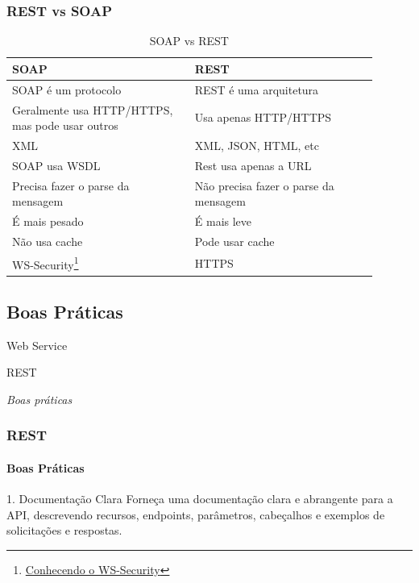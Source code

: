 \documentclass[
	10pt, %
	t, %
]{beamer}
\begin{document}
\begin{frame}
	\frametitle{REST vs SOAP}
	
	\begin{table}
		\renewcommand{\arraystretch}{1.25} %
		\begin{tabular}{|p{0.45\linewidth}|p{0.45\linewidth}|}
			\hline
			\textbf{SOAP} & \textbf{REST} \\ \hline
			SOAP é um protocolo & REST é uma arquitetura \\ \hline
			Geralmente usa HTTP/HTTPS, mas pode usar outros & Usa apenas HTTP/HTTPS \\ \hline
			XML & XML, JSON, HTML, etc \\ \hline
			SOAP usa WSDL & Rest usa apenas a URL \\ \hline
			Precisa fazer o parse da mensagem & Não precisa fazer o parse da mensagem \\ \hline
			É mais pesado & É mais leve \\ \hline
			Não usa cache & Pode usar cache \\ \hline
			WS-Security\footnote{\href{https://xaropedecafe.medium.com/conhecendo-o-ws-security-c6c775b461fd}{Conhecendo o WS-Security}} & HTTPS \\ \hline
		\end{tabular}
		\caption{SOAP vs REST}
		\label{tab:soap_rest}

	\end{table}

\end{frame}

\subsection{Boas Práticas}

\begin{frame}
	\begin{center}
		
		\bigskip\bigskip\bigskip\bigskip %
		{\Large Web Service}
		
		\bigskip\bigskip %
		{\Huge REST}
		
		\smallskip
		{\small \textit{Boas práticas}}
	\end{center}

\end{frame}

\begin{frame}
	\frametitle{REST}
	\framesubtitle{Boas Práticas}

	\begin{block}{1. Documentação Clara}
		Forneça uma documentação clara e abrangente para a API, descrevendo recursos, endpoints, parâmetros, cabeçalhos e exemplos de solicitações e respostas.
	\end{block}

\end{frame}
\end{document}
